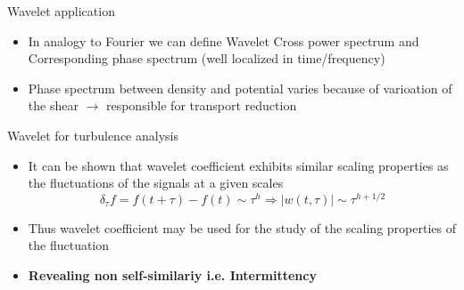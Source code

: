 \documentclass[t,10pt]{beamer}
\begin{document}
\begin{frame}{Wavelet application}
\begin{itemize}
\item In analogy to Fourier we can define Wavelet Cross power spectrum
  and Corresponding phase spectrum (well localized in time/frequency)


\item Phase spectrum between density and potential varies because of
  varioation of the shear $\rightarrow$ responsible for transport
  reduction {\footnotesize\parencite{Antoni:2000bn}}

\end{itemize}
\end{frame}


\begin{frame}{Wavelet for turbulence analysis}
 \begin{itemize}[<+->]
  \item It can be shown that wavelet coefficient exhibits similar
    scaling properties as the fluctuations of the signals at a given
    scales
\begin{equation*}
\delta_{\tau} f = f(t+\tau)-f(t) \sim \tau^h \Rightarrow |w(t,\tau)|\sim\tau^{h+1/2}
\end{equation*}
\item Thus wavelet coefficient may be used for the study of the
  scaling properties of the fluctuation

\item \textcolor{tascarletred}{\textbf{Revealing non
      self-similariy i.e. Intermittency}}


\end{itemize}
\end{frame}
\end{document}
